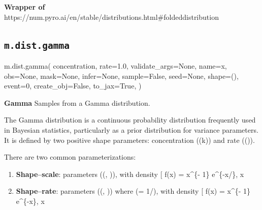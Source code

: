 \documentclass[
  letterpaper,
  DIV=11,
  numbers=noendperiod]{scrartcl}
\newenvironment{Shaded}{\begin{snugshade}}{\end{snugshade}}
\newcommand{\DecValTok}[1]{\textcolor[rgb]{0.68,0.00,0.00}{#1}}
\newcommand{\FloatTok}[1]{\textcolor[rgb]{0.68,0.00,0.00}{#1}}
\newcommand{\NormalTok}[1]{\textcolor[rgb]{0.00,0.23,0.31}{#1}}
\newcommand{\OperatorTok}[1]{\textcolor[rgb]{0.37,0.37,0.37}{#1}}
\newcommand{\StringTok}[1]{\textcolor[rgb]{0.13,0.47,0.30}{#1}}
\newcommand{\VariableTok}[1]{\textcolor[rgb]{0.07,0.07,0.07}{#1}}
\begin{document}
\textbf{Wrapper of}
https://num.pyro.ai/en/stable/distributions.html\#foldeddistribution

\subsection{\texorpdfstring{\texttt{m.dist.gamma}}{m.dist.gamma}}\label{gamma}

\begin{Shaded}
\begin{Highlighting}[]
\NormalTok{m.dist.gamma(}
\NormalTok{    concentration,}
\NormalTok{    rate}\OperatorTok{=}\FloatTok{1.0}\NormalTok{,}
\NormalTok{    validate\_args}\OperatorTok{=}\VariableTok{None}\NormalTok{,}
\NormalTok{    name}\OperatorTok{=}\StringTok{\textquotesingle{}x\textquotesingle{}}\NormalTok{,}
\NormalTok{    obs}\OperatorTok{=}\VariableTok{None}\NormalTok{,}
\NormalTok{    mask}\OperatorTok{=}\VariableTok{None}\NormalTok{,}
\NormalTok{    infer}\OperatorTok{=}\VariableTok{None}\NormalTok{,}
\NormalTok{    sample}\OperatorTok{=}\VariableTok{False}\NormalTok{,}
\NormalTok{    seed}\OperatorTok{=}\VariableTok{None}\NormalTok{,}
\NormalTok{    shape}\OperatorTok{=}\NormalTok{(),}
\NormalTok{    event}\OperatorTok{=}\DecValTok{0}\NormalTok{,}
\NormalTok{    create\_obj}\OperatorTok{=}\VariableTok{False}\NormalTok{,}
\NormalTok{    to\_jax}\OperatorTok{=}\VariableTok{True}\NormalTok{,}
\NormalTok{)}
\end{Highlighting}
\end{Shaded}

\textbf{Gamma} Samples from a Gamma distribution.

The Gamma distribution is a continuous probability distribution
frequently used in Bayesian statistics, particularly as a prior
distribution for variance parameters. It is defined by two positive
shape parameters: concentration ((k)) and rate ((\lambda)).

There are two common parameterizations:

\begin{enumerate}
\def\labelenumi{\arabic{enumi}.}
\item
  \textbf{Shape--scale}: parameters ((\alpha, \theta)), with density {[}
  f(x) =  x\^{}\{\alpha - 1\}
  e\^{}\{-x/\theta\}, \quad x \ge 0{]}
\item
  \textbf{Shape--rate}: parameters ((\alpha, \lambda)) where (\lambda =
  1/\theta), with density {[} f(x) =
  \frac{\lambda^\alpha}{\Gamma(\alpha)} x\^{}\{\alpha - 1\}
  e\^{}\{-\lambda x\}, \quad x \ge 0{]}
\end{enumerate}
\end{document}
